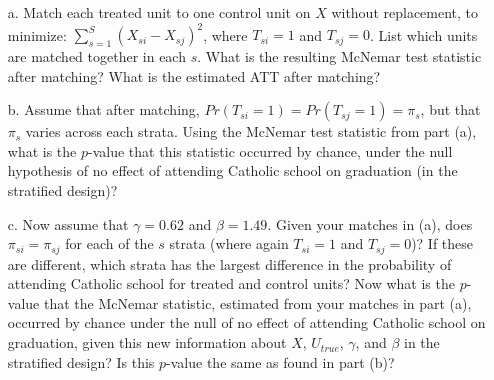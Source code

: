 \documentclass{article}
\begin{document}
\begin{itemize}

\item[a.] Match each treated unit to one control unit on $X$ without
  replacement,
  to minimize: $\sum_{s=1}^{S}(X_{si}-X_{sj})^2$, where $T_{si}=1$ and
  $T_{sj}=0$. List which units are matched together in each $s$.  What
  is the resulting McNemar test statistic after matching?  What is the
  estimated ATT after matching?

\item[b.] Assume that after matching,
  $Pr(T_{si}=1)=Pr(T_{sj}=1)=\pi_{s}$, but that $\pi_s$ varies across
  each strata.  Using the McNemar test statistic from part (a),
  what is the $p$-value that this statistic occurred by chance, under
  the null hypothesis of no effect of attending Catholic school on
  graduation (in the stratified design)?

\item[c.] Now assume that $\gamma=0.62$ and $\beta=1.49$.
  Given your matches in (a), does $\pi_{si}=\pi_{sj}$ for each of the
  $s$ strata (where again $T_{si}=1$ and $T_{sj}=0$)?  If these are
  different, which strata has the largest difference in the
  probability of attending Catholic school for treated and control
  units?  Now what is the $p$-value that the McNemar statistic,
  estimated from your matches in part (a), occurred by chance under
  the null of no effect of attending Catholic school on graduation,
  given this new information about $X$, $U_{true}$, $\gamma$, and
  $\beta$ in the stratified design?  Is this $p$-value the same as
  found in part (b)?

\end{itemize}

\end{document}
